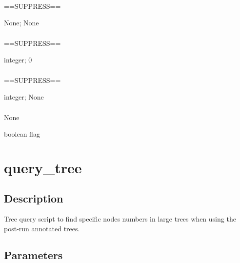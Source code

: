 \documentclass[letterpaper,12pt,english]{sphinxmanual}
\begin{document}
\subsubsection{}
\label{\detokenize{prog_desc:id5}}
 ==SUPPRESS==

 None;  None


\subsubsection{}
\label{\detokenize{prog_desc:startk}}
 ==SUPPRESS==

 integer;  0


\subsubsection{}
\label{\detokenize{prog_desc:stopk}}
 ==SUPPRESS==

 integer;  None


\subsubsection{}
\label{\detokenize{prog_desc:id6}}
 None

 boolean flag


\section{query\_tree}
\label{\detokenize{prog_desc:query-tree}}

\subsection{Description}
\label{\detokenize{prog_desc:id7}}
Tree query script to find specific nodes numbers in large trees
when using the post-run annotated trees.



\subsection{Parameters}
\label{\detokenize{prog_desc:id8}}
\end{document}
